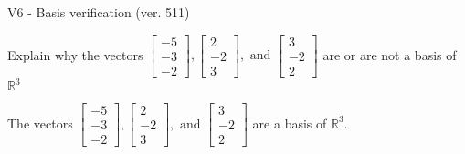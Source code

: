 \begin{exercise}
  \begin{exerciseTitle}V6 - Basis verification (ver. 511)\end{exerciseTitle}
  \begin{exerciseStatement}
    Explain why the vectors \(\left[\begin{array}{r}
-5 \\
-3 \\
-2
\end{array}\right] , \left[\begin{array}{r}
2 \\
-2 \\
3
\end{array}\right] , \text{ and } \left[\begin{array}{r}
3 \\
-2 \\
2
\end{array}\right]\) are or are not a basis of \(\mathbb{R}^3\)	


  \end{exerciseStatement}
  \begin{exerciseAnswer}
   The vectors \(\left[\begin{array}{r}
-5 \\
-3 \\
-2
\end{array}\right] , \left[\begin{array}{r}
2 \\
-2 \\
3
\end{array}\right] , \text{ and } \left[\begin{array}{r}
3 \\
-2 \\
2
\end{array}\right]\) 
  	 are  a basis of \(\mathbb{R}^3\).
  


  \end{exerciseAnswer}
\end{exercise}